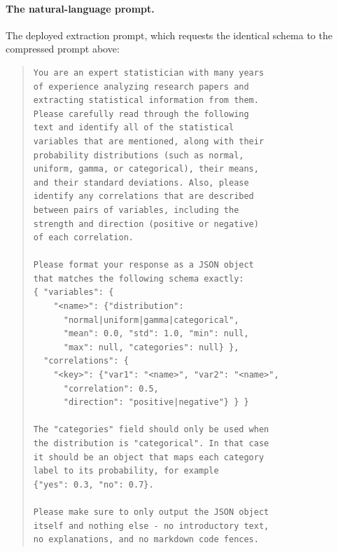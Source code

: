 \documentclass[letterpaper]{article} %
\begin{document}
\paragraph{The natural-language prompt.} The deployed extraction prompt, which
requests the identical schema to the compressed prompt above:

\begin{quote}\begin{scriptsize}\begin{verbatim}
You are an expert statistician with many years
of experience analyzing research papers and
extracting statistical information from them.
Please carefully read through the following
text and identify all of the statistical
variables that are mentioned, along with their
probability distributions (such as normal,
uniform, gamma, or categorical), their means,
and their standard deviations. Also, please
identify any correlations that are described
between pairs of variables, including the
strength and direction (positive or negative)
of each correlation.

Please format your response as a JSON object
that matches the following schema exactly:
{ "variables": {
    "<name>": {"distribution":
      "normal|uniform|gamma|categorical",
      "mean": 0.0, "std": 1.0, "min": null,
      "max": null, "categories": null} },
  "correlations": {
    "<key>": {"var1": "<name>", "var2": "<name>",
      "correlation": 0.5,
      "direction": "positive|negative"} } }

The "categories" field should only be used when
the distribution is "categorical". In that case
it should be an object that maps each category
label to its probability, for example
{"yes": 0.3, "no": 0.7}.

Please make sure to only output the JSON object
itself and nothing else - no introductory text,
no explanations, and no markdown code fences.
\end{verbatim}\end{scriptsize}\end{quote}

\def\isChecklistMainFile{}

\end{document}

